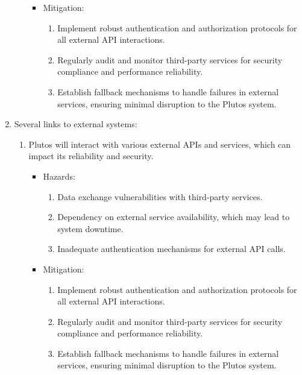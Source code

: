 \documentclass{article}
\begin{document}
\begin{enumerate}
\begin{enumerate}
\begin{itemize}
			\item Mitigation:
				\begin{enumerate}
					\item Implement robust authentication and authorization protocols for all external API interactions.
                    \item Regularly audit and monitor third-party services for security compliance and performance reliability.
                    \item Establish fallback mechanisms to handle failures in external services, ensuring minimal disruption 
                    to the Plutos system.
                \end{enumerate}
        \end{itemize}
    \end{enumerate}
    \item Several links to external systems:
    \begin{enumerate}
        \item Plutos will interact with various external APIs and services, which can 
        impact its reliability and security. 
		\begin{itemize}
			\item Hazards:
				\begin{enumerate}
					\item Data exchange vulnerabilities with third-party services.
                    \item Dependency on external service availability, which may lead to system downtime.
                    \item Inadequate authentication mechanisms for external API calls.
				\end{enumerate}
			\item Mitigation:
				\begin{enumerate}
					\item Implement robust authentication and authorization protocols for all external API interactions.
                    \item Regularly audit and monitor third-party services for security compliance and performance reliability.
                    \item Establish fallback mechanisms to handle failures in external services, ensuring minimal disruption 
                    to the Plutos system.
                \end{enumerate}
        \end{itemize}
    \end{enumerate}

\end{enumerate}
\end{document}
